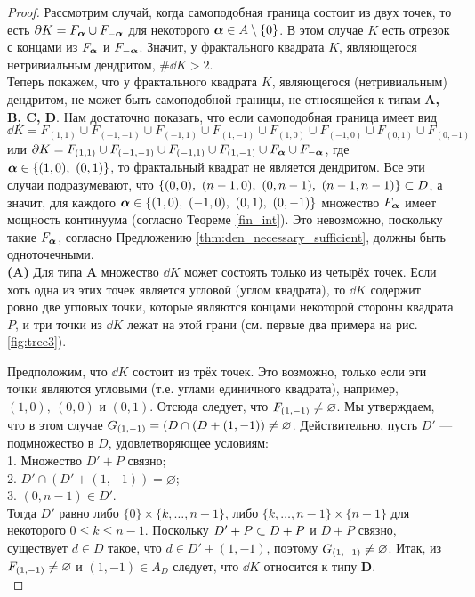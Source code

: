 \begin{proof}
Рассмотрим случай, когда самоподобная граница состоит из двух точек, то есть $\partial K=F_{\bm{\alpha}}\cup F_{-{\bm{\alpha}}}$ для некоторого ${\bm{\alpha}}\in A\setminus\{0\}$.
В этом случае $K$  есть отрезок с концами из $F_{\bm{\alpha}}$ и $ F_{-{\bm{\alpha}}}$.
Значит, у фрактального квадрата $K$, являющегося нетривиальным дендритом, $\#\dd K>2$.\\

Теперь покажем, что у фрактального квадрата $K$, являющегося (нетривиальным) дендритом, не может быть самоподобной границы, не относящейся к типам {\bf A, B, C, D}.
Нам достаточно показать, что если самоподобная граница имеет вид $\dd K=F_{(1,1)}\cup F_{(-1,-1)}\cup F_{(-1,1)}\cup F_{(1,-1)}\cup F_{(1,0)}\cup F_{(-1,0)}\cup F_{(0,1)}\cup F_{(0,-1)}$ или $\partial K=F_{(1,1)}\cup F_{(-1,-1)}\cup F_{(-1,1)}\cup F_{(1,-1)}\cup F_{\bm{\alpha}}\cup F_{-{\bm{\alpha}}}$, где ${\bm{\alpha}}\in\{(1,0),\ (0,1)\}$, то фрактальный квадрат не является дендритом.
Все эти случаи подразумевают, что $\{(0,0),\ (n-1,0),\ (0,n-1),\ (n-1,n-1)\}\subset D$, а значит, для каждого ${\bm{\alpha}}\in\{(1,0),\ (-1,0),\ (0,1),\ (0,-1)\}$ множество $F_{\bm{\alpha}}$ имеет мощность континуума (согласно Теореме \ref{fin_int}).
Это невозможно, поскольку такие $F_{\bm{\alpha}}$, согласно Предложению \ref{thm:den_necessary_sufficient}, должны быть одноточечными.\\

{\bf (A)} Для типа {\bf A} множество $\dd K$ может состоять только из четырёх точек. 
Если хоть одна из этих точек является угловой (углом квадрата), то $\dd K$ содержит ровно две угловых точки, которые являются концами некоторой стороны квадрата $P$, и три точки из $\dd K$ лежат на этой грани (см. первые два примера на рис. \ref{fig:tree3}).

Предположим, что $\dd K$ состоит из трёх точек.
Это возможно, только если эти точки являются угловыми (т.е. углами единичного квадрата), например, $(1,0),\ (0,0)$ и $(0,1)$.
Отсюда следует, что $F_{(1,-1)}\neq\varnothing$.
Мы утверждаем, что в этом случае $G_{(1,-1)}=(D\cap (D+(1,-1))\neq\varnothing$.
Действительно, пусть $D'$ --- подмножество в $D$, удовлетворяющее условиям:\\
1. Множество $D'+P$ связно;\\
2. $D'\cap (D'+(1,-1))=\varnothing$;\\
3. $(0,n-1)\in D'$. \\
Тогда $D'$ равно либо $\{0\}\times\{k,\ldots,n-1\}$, либо $\{k,\ldots,n-1\}\times\{n-1\}$ для некоторого $0\leq k\leq n-1$.
Поскольку $D'+P\subset D+P$ и $D+P$ связно, существует $d\in D$ такое, что $d\in D'+(1,-1)$, поэтому $G_{(1,-1)}\neq\varnothing$.
Итак, из $F_{(1,-1)}\neq\varnothing$ и $(1,-1)\in A_D$ следует, что $\dd K$ относится к типу {\bf D}. \\


\end{proof}
